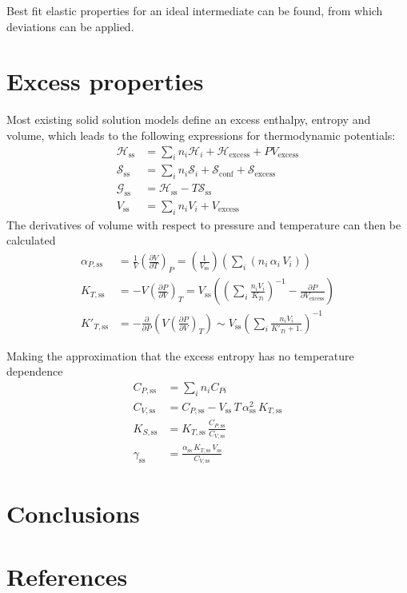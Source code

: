 \documentclass[review]{elsarticle}
\begin{document}
Best fit elastic properties for an ideal intermediate can be found, from which deviations can be applied.  


\section{Excess properties}
Most existing solid solution models define an excess enthalpy, entropy and volume, which leads to the following expressions for thermodynamic potentials:
\begin{eqnarray}
\mathcal{H}_{\textrm{ss}} &= \sum_in_i\mathcal{H}_i + \mathcal{H}_{\textrm{excess}} + PV_{\textrm{excess}}\\
\mathcal{S}_{\textrm{ss}} &= \sum_in_i\mathcal{S}_i + \mathcal{S}_{\textrm{conf}} + \mathcal{S}_{\textrm{excess}} \\
\mathcal{G}_{\textrm{ss}} &= \mathcal{H}_{\textrm{ss}} - T\mathcal{S}_{\textrm{ss}}\\
V_{\textrm{ss}} &= \sum_in_iV_i + V_{\textrm{excess}}
\end{eqnarray}
The derivatives of volume with respect to pressure and temperature can then be calculated
\begin{eqnarray}
\alpha_{P,\textrm{ss}} &= \frac{1}{V}\left(\frac{\partial V}{\partial T}\right)_P = \left( \frac{1}{V_{\textrm{ss}}}\right)\left( \sum_i\left(n_i\,\alpha_i\,V_i \right) \right) \\
K_{T,\textrm{ss}} &= -V\left( \frac{\partial P}{\partial V} \right)_T = V_{\textrm{ss}} \left( \left(\sum_i \frac{n_i V_{i}}{K_{Ti}} \right)^{-1} - \frac{\partial P}{\partial V_{\textrm{excess}}} \right) \\
K'_{T,\textrm{ss}} &= -\frac{\partial}{\partial P} \left (V\left( \frac{\partial P}{\partial V} \right)_T \right) \sim V_{\textrm{ss}} \left(\sum_i \frac{n_i V_{i}}{K'_{Ti} + 1.} \right)^{-1}
\end{eqnarray}

Making the approximation that the excess entropy has no temperature dependence
\begin{eqnarray}
C_{P,\textrm{ss}} &= \sum_in_iC_{Pi}\\
C_{V, \textrm{ss}} &= C_{P,\textrm{ss}} - V_{\textrm{ss}}\,T\,\alpha_{\textrm{ss}}^{2}\,K_{T,\textrm{ss}} \\
K_{S,\textrm{ss}} &= K_{T,\textrm{ss}} \,\frac{C_{P,\textrm{ss}}}{C_{V,\textrm{ss}}}\\
\gamma_{\textrm{ss}} &= \frac{\alpha_{\textrm{ss}}\,K_{T,\textrm{ss}}\,V_{\textrm{ss}}}{C_{V, \textrm{ss}}}
\end{eqnarray}

\section{Conclusions}



\clearpage
\section*{References}


\end{document}

